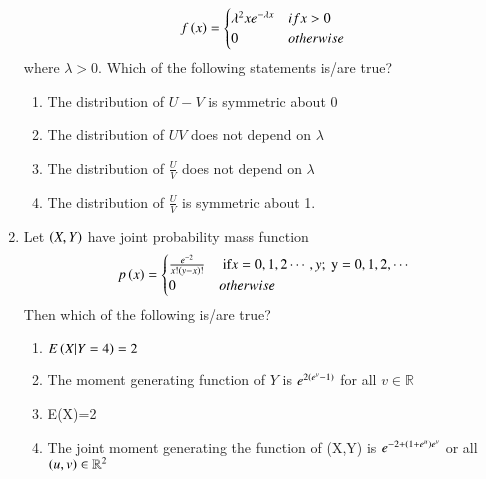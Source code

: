 \documentclass[journal,12pt,onecolumn]{IEEEtran}
\theoremstyle{remark}
\begin{document}
\begin{enumerate}
\[
f\left(x\right)=
\begin{cases}
    \lambda^2xe^{-\lambda x} & if x>0\\
    0 & otherwise
\end{cases}
\]
where $\lambda >0$. Which of the following statements is/are true?
\begin{enumerate}
    \item The distribution of $U-V$ is symmetric about 0
    \item The distribution of $UV$ does not depend on $\lambda$
    \item The distribution of $\frac{U}{V}$ does not depend on $\lambda$
    \item The distribution of $\frac{U}{V}$ is symmetric about 1.
\end{enumerate}
\item Let $\left(X,Y\right)$ have joint probability mass function    \[p\left(x\right)=
\begin{cases}
    \frac{e^{-2}}{x!\left(y-x\right)!} & \text{ if} x=0,1,2\cdots,y; \text{ y}=0,1,2,\cdots\\
    0 & otherwise
\end{cases}
\]
Then which of the following is/are true?
\begin{enumerate}
    \item $E\left(X|Y=4\right)=2$
    \item The moment generating function of $Y$ is $e^{2\left(e^v-1\right)}$ for all $v \in \mathbb{R}$
    \item E(X)=2
    \item The joint moment generating the function of (X,Y) is $e^{-2+\left(1+e^u\right)e^v}$ or all $\left(u,v\right)\in \mathbb{R}^2$
    

\end{enumerate}
\end{enumerate}
\end{document}
